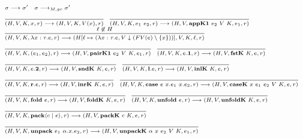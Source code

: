 \documentclass[fleqn]{article}
\begin{document}
\[
\scriptsize
\begin{array}{l}
\sigma \longrightarrow \sigma' \hspace{1em} \sigma \longrightarrow_{M,gc} \sigma' \\
\infer{(H,V,K,x,r) \longrightarrow (H,V,K,V(x),r)}{\vspace{1em}} \hspace{1em}
\infer{(H,V,K,e_1~e_2,r) \longrightarrow (H,V,\mathbf{appK1}~e_2~V~K,e_1,r)}{\vspace{1em}} \\
\infer{(H,V,K,\lambda x:\tau. e,r) \longrightarrow (H[\ell \mapsto (\lambda x : \tau. e, V \downarrow (FV(e) \setminus \{x\}))],V,K,\ell,r)}{\ell \not\in H} \\
\infer{(H,V,K,(e_1,e_2),r) \longrightarrow (H,V,\mathbf{pairK1}~e_2~V~K,e_1,r)}{\vspace{1em}} \hspace{1em}
\infer{(H,V,K,e.\mathbf{1},r) \longrightarrow (H,V,\mathbf{fstK}~K,e,r)}{\vspace{1em}} \\
\infer{(H,V,K,e.\mathbf{2},r) \longrightarrow (H,V,\mathbf{sndK}~K,e,r)}{\vspace{1em}} \hspace{1em}
\infer{(H,V,K,\mathbf{l}.e,r) \longrightarrow (H,V,\mathbf{inlK}~K,e,r)}{\vspace{1em}} \\
\infer{(H,V,K,\mathbf{r}.e,r) \longrightarrow (H,V,\mathbf{inrK}~K,e,r)}{\vspace{1em}} \hspace{1em}
\infer{(H,V,K,\mathbf{case}~e~x.e_1~x.e_2,r) \longrightarrow (H,V,\mathbf{caseK}~x~e_1~e_2~V~K,e,r)}{\vspace{1em}} \\
\infer{(H,V,K,\mathbf{fold}~e,r) \longrightarrow (H,V,\mathbf{foldK}~K,e,r)}{\vspace{1em}} \hspace{1em}
\infer{(H,V,K,\mathbf{unfold}~e,r) \longrightarrow (H,V,\mathbf{unfoldK}~K,e,r)}{\vspace{1em}} \\
\infer{(H,V,K,\mathbf{pack} \langle c \mid e \rangle,r) \longrightarrow (H,V,\mathbf{packK}~c~K,e,r)}{\vspace{1em}} \\
\infer{(H,V,K,\mathbf{unpack}~e_1~\alpha.x. e_2,r) \longrightarrow (H,V,\mathbf{unpackK}~\alpha~x~e_2~V~K,e_1,r)}{\vspace{1em}} \hspace{1em}

\end{array}\]
\end{document}
